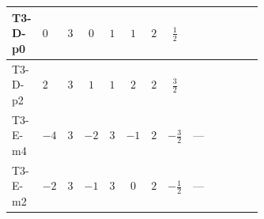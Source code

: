\documentclass[8pt]{article}
\begin{document}
\begin{landscape}
\begin{longtable}{@{}llcccccc >{\raggedright\arraybackslash}p{0.21\linewidth} >{\raggedright\arraybackslash}p{0.21\linewidth} >{\raggedright\arraybackslash}p{0.21\linewidth}@{}}
T3-D-p0 & $0$ & $3$ & $0$ & $1$ & $1$ & $2$ & $\frac{1}{2}$ & \scriptsize\adjustbox{max width=\linewidth}{$\begin{gathered} \frac{1}{4} (3 \left(\left({y_1}\right)^{T}\,\left({y_1}\right)^{*}\,{M_F}\right)_{ij}+2 \left({M_F}\,\left({y_2}\right)^{\dagger}\,{y_2}\right)_{ij})\end{gathered}$} & \scriptsize\adjustbox{max width=\linewidth}{$\begin{gathered} -\frac{9}{2} {g_2}^2 \left({M_F}\right)_{ij}\end{gathered}$} & \scriptsize\adjustbox{max width=\linewidth}{$\begin{gathered} -\frac{3}{2} {g_1}^2 \left({M_F}\right)_{ij}\end{gathered}$} \\
\midrule
T3-D-p2 & $2$ & $3$ & $1$ & $1$ & $2$ & $2$ & $\frac{3}{2}$ & \scriptsize\adjustbox{max width=\linewidth}{$\begin{gathered} \frac{1}{4} (3 \left(\left({y_1}\right)^{T}\,\left({y_1}\right)^{*}\,{M_F}\right)_{ij}+2 \left({M_F}\,\left({y_2}\right)^{\dagger}\,{y_2}\right)_{ij})\end{gathered}$} & \scriptsize\adjustbox{max width=\linewidth}{$\begin{gathered} -\frac{9}{2} {g_2}^2 \left({M_F}\right)_{ij}\end{gathered}$} & \scriptsize\adjustbox{max width=\linewidth}{$\begin{gathered} -\frac{27}{2} {g_1}^2 \left({M_F}\right)_{ij}\end{gathered}$} \\
\midrule
T3-E-m4 & $-4$ & $3$ & $-2$ & $3$ & $-1$ & $2$ & $-\frac{3}{2}$ & --- & \scriptsize\adjustbox{max width=\linewidth}{$\begin{gathered} -\frac{9}{2} {g_2}^2 \left({M_F}\right)_{ij}\end{gathered}$} & \scriptsize\adjustbox{max width=\linewidth}{$\begin{gathered} -\frac{27}{2} {g_1}^2 \left({M_F}\right)_{ij}\end{gathered}$} \\
\midrule
T3-E-m2 & $-2$ & $3$ & $-1$ & $3$ & $0$ & $2$ & $-\frac{1}{2}$ & --- & \scriptsize\adjustbox{max width=\linewidth}{$\begin{gathered} -\frac{9}{2} {g_2}^2 \left({M_F}\right)_{ij}\end{gathered}$} & \scriptsize\adjustbox{max width=\linewidth}{$\begin{gathered} -\frac{3}{2} {g_1}^2 \left({M_F}\right)_{ij}\end{gathered}$} \\

\end{longtable}
\end{landscape}
\end{document}
